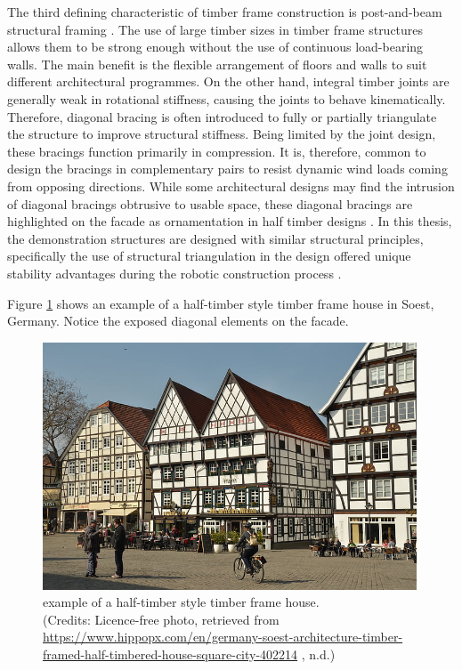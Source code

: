 The third defining characteristic of timber frame construction is post-and-beam structural framing \parencite{jacksobonHistoricAmericanTimber2014,sobonTimberFrameConstruction1984}. The use of large timber sizes in timber frame structures allows them to be strong enough without the use of continuous load-bearing walls. The main benefit is the flexible arrangement of floors and walls to suit different architectural programmes. 
On the other hand, integral timber joints are generally weak in rotational stiffness, causing the joints to behave kinematically. Therefore, diagonal bracing is often introduced to fully or partially triangulate the structure to improve structural stiffness. Being limited by the joint design, these bracings function primarily in compression. It is, therefore, common to design the bracings in complementary pairs to resist dynamic wind loads coming from opposing directions. While some architectural designs may find the intrusion of diagonal bracings obtrusive to usable space, these diagonal bracings are highlighted on the facade as ornamentation in half timber designs \parencite{gernerFachwerkEntwicklungGefuege1979}. In this thesis, the demonstration structures are designed with similar structural principles, specifically the use of structural triangulation in the design offered unique stability advantages during the robotic construction process  .

Figure \ref{fig:half-timber-frame-example} shows an example of a half-timber style timber frame house in Soest, Germany. Notice the exposed diagonal elements on the facade.

\begin{figure}
    \centering
    \includegraphics[width=0.99\textwidth]{images/01/germany-soest-architecture-timber-framed-preview.jpg}
    \caption{example of a half-timber style timber frame house. \\
        \footnotesize{(Credits: Licence-free photo, retrieved from \url{https://www.hippopx.com/en/germany-soest-architecture-timber-framed-half-timbered-house-square-city-402214} , n.d.)}}
    \label{fig:half-timber-frame-example}
\end{figure}


